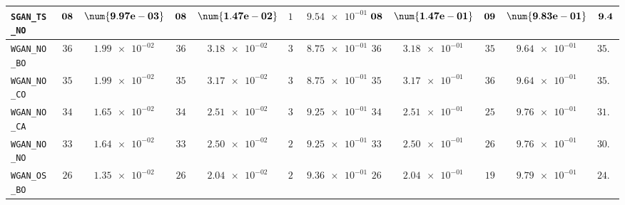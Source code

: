 \begin{table}[H]
\begin{tabularx}{\textwidth}{l||cC|cC|cC|cC|cC||c}
		\texttt{SGAN\_TS\_NO} & $\bf 08$ & $\bf \num{9.97e-03}$ & $\bf 08$ & $\bf \num{1.47e-02}$ & $ 14$ & $ \num{9.54e-01}$ & $\bf 08$ & $\bf \num{1.47e-01}$ & $\bf 09$ & $\bf \num{9.83e-01}$ & $\bf 9.4$  \\ \hline
		\texttt{WGAN\_NO\_BO} & $ 36$ & $ \num{1.99e-02}$ & $ 36$ & $ \num{3.18e-02}$ & $ 35$ & $ \num{8.75e-01}$ & $ 36$ & $ \num{3.18e-01}$ & $ 35$ & $ \num{9.64e-01}$ & $ 35.6$  \\
		\texttt{WGAN\_NO\_CO} & $ 35$ & $ \num{1.99e-02}$ & $ 35$ & $ \num{3.17e-02}$ & $ 36$ & $ \num{8.75e-01}$ & $ 35$ & $ \num{3.17e-01}$ & $ 36$ & $ \num{9.64e-01}$ & $ 35.4$  \\
		\texttt{WGAN\_NO\_CA} & $ 34$ & $ \num{1.65e-02}$ & $ 34$ & $ \num{2.51e-02}$ & $ 30$ & $ \num{9.25e-01}$ & $ 34$ & $ \num{2.51e-01}$ & $ 25$ & $ \num{9.76e-01}$ & $ 31.4$  \\
		\texttt{WGAN\_NO\_NO} & $ 33$ & $ \num{1.64e-02}$ & $ 33$ & $ \num{2.50e-02}$ & $ 29$ & $ \num{9.25e-01}$ & $ 33$ & $ \num{2.50e-01}$ & $ 26$ & $ \num{9.76e-01}$ & $ 30.8$  \\
		\texttt{WGAN\_OS\_BO} & $ 26$ & $ \num{1.35e-02}$ & $ 26$ & $ \num{2.04e-02}$ & $ 24$ & $ \num{9.36e-01}$ & $ 26$ & $ \num{2.04e-01}$ & $ 19$ & $ \num{9.79e-01}$ & $ 24.2$  \\

\end{tabularx}
\end{table}

